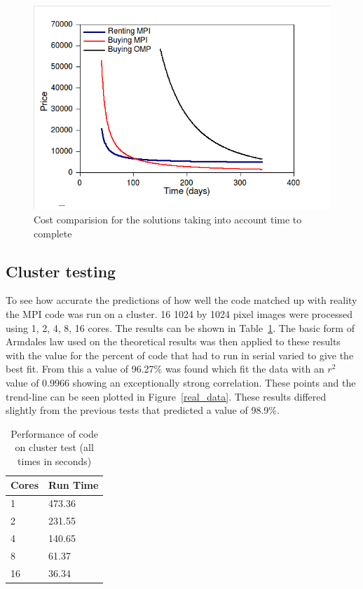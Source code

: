 \begin{figure}[ht]
	\begin{center}
		\includegraphics[width=1.0\textwidth]{mpi-time-money}
	\end{center}
	\caption{Cost comparision for the solutions taking into account time to complete}
	\label{mpi-time-money}
\end{figure}


\subsection{Cluster testing}
To see how accurate the predictions of how well the code matched up with reality the MPI code was run on a cluster. 16 1024 by 1024 pixel images were processed using 1, 2, 4, 8, 16 cores. The results can be shown in Table~\ref{shit}. The basic form of Armdales law used on the theoretical results was then applied to these results with the value for the percent of code that had to run in serial varied to give the best fit. From this a value of 96.27\% was found which fit the data with an \(r^2\) value of 0.9966 showing an exceptionally strong correlation. These points and the trend-line can be seen plotted in Figure~\ref{real_data}. These results differed slightly from the previous tests that predicted a value of 98.9\%. 

\begin{table}[h]
	\caption{Performance of code on cluster test (all times in seconds)}
	\begin{center}
    	\begin{tabular}{ | l | l |}
    	\hline
    	Cores & Run Time  \\ \hline
		1 & 473.36 \\ \hline
		2 & 231.55 \\ \hline
		4 & 140.65 \\ \hline
		8 & 61.37 \\ \hline
		16 & 36.34 \\ \hline
    	\end{tabular}
	\end{center}
	\label{shit}
\end{table}

